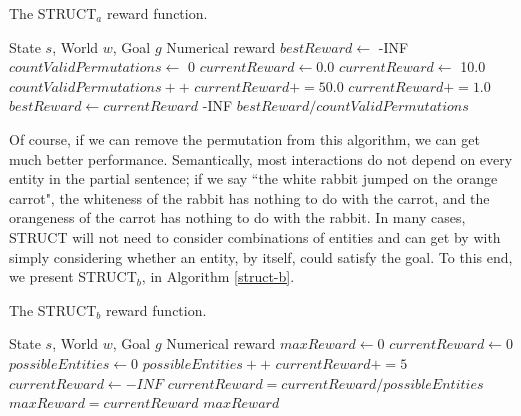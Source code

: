 \begin{algorithm}
\caption{The STRUCT$_a$ reward function.}\label{struct-a}
\begin{algorithmic}[1]
\REQUIRE State $s$, World $w$, Goal $g$
\ENSURE Numerical reward
\STATE $bestReward \gets$ -INF
\STATE $countValidPermutations \gets$ 0
	\STATE $currentReward \gets 0.0$
		\STATE $currentReward \gets$ 10.0
		\STATE $countValidPermutations++$
	\ENDIF
		\STATE $currentReward += 50.0$
	\ENDIF
			\STATE $currentReward += 1.0$
		\ENDIF
	\ENDFOR
		\STATE $bestReward \gets currentReward$
	\ENDIF
\ENDFOR
{}
	\RETURN -INF
\ENDIF
\RETURN $bestReward / countValidPermutations$
\end{algorithmic}
\end{algorithm}

Of course, if we can remove the permutation from this algorithm,
we can get much better performance.  Semantically, most interactions do not
depend on every entity in the partial sentence; if we say ``the white rabbit
jumped on the orange carrot", the whiteness of the rabbit has nothing to do
with the carrot, and the orangeness of the carrot has nothing to do with the rabbit.  
In many cases,
STRUCT will not need to consider combinations of entities and
can get by with simply considering whether an entity, by itself, could
satisfy the goal.  To this end, we present STRUCT$_b$, in Algorithm \ref{struct-b}.

\begin{algorithm}
\caption{The STRUCT$_b$ reward function.}\label{struct-b}
\begin{algorithmic}[1]
\REQUIRE State $s$, World $w$, Goal $g$
\ENSURE Numerical reward
\STATE $maxReward \gets 0$
	\STATE $currentReward \gets 0$
	\STATE $possibleEntities \gets 0$
			\STATE $possibleEntities++$
		\ENDIF
			\STATE $currentReward += 5$
		\ENDIF
		\ENDFOR
	\ENDFOR
		\STATE $currentReward \gets -INF$
	\ELSE
		\STATE $currentReward = currentReward / possibleEntities$
	\ENDIF
		\STATE $maxReward = currentReward$
	\ENDIF
\ENDFOR
\RETURN $maxReward$
\end{algorithmic}
\end{algorithm}

